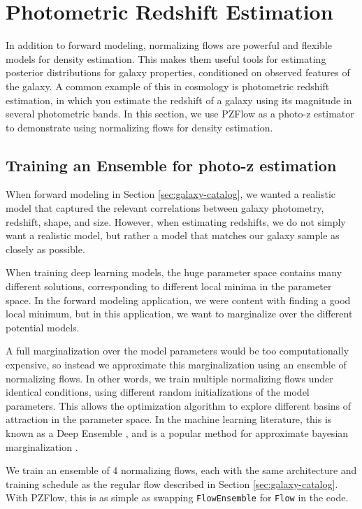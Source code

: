 \documentclass[twocolumn,twocolappendix]{aastex631}
\begin{document}
\section{Photometric Redshift Estimation}
\label{sec:photo-z}

In addition to forward modeling, normalizing flows are powerful and flexible models for density estimation.
This makes them useful tools for estimating posterior distributions for galaxy properties, conditioned on observed features of the galaxy.
A common example of this in cosmology is photometric redshift estimation, in which you estimate the redshift of a galaxy using its magnitude in several photometric bands.
In this section, we use PZFlow as a photo-z estimator to demonstrate using normalizing flows for density estimation.

\subsection{Training an Ensemble for photo-z estimation}

When forward modeling in Section \ref{sec:galaxy-catalog}, we wanted a realistic model that captured the relevant correlations between galaxy photometry, redshift, shape, and size.
However, when estimating redshifts, we do not simply want a realistic model, but rather a model that matches our galaxy sample as closely as possible.

When training deep learning models, the huge parameter space contains many different solutions, corresponding to different local minima in the parameter space.
In the forward modeling application, we were content with finding a good local minimum, but in this application, we want to marginalize over the different potential models.

A full marginalization over the model parameters would be too computationally expensive, so instead we approximate this marginalization using an ensemble of normalizing flows.
In other words, we train multiple normalizing flows under identical conditions, using different random initializations of the model parameters.
This allows the optimization algorithm to explore different basins of attraction in the parameter space.
In the machine learning literature, this is known as a Deep Ensemble \citep{lakshminarayanan2017}, and is a popular method for approximate bayesian marginalization \citep{wilson2020,fort2020}.

We train an ensemble of 4 normalizing flows, each with the same architecture and training schedule as the regular flow described in Section \ref{sec:galaxy-catalog}.
With PZFlow, this is as simple as swapping \texttt{FlowEnsemble} for \texttt{Flow} in the code.
\end{document}
